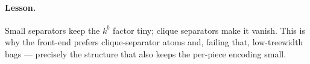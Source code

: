\documentclass[11pt]{article}
\theoremstyle{definition}
\theoremstyle{remark}
\begin{document}
\paragraph{Lesson.} Small separators keep the $k^{b}$ factor tiny; clique
separators make it vanish. This is why the front-end prefers clique-separator atoms
and, failing that, low-treewidth bags --- precisely the structure that also keeps
the per-piece encoding small.



\end{document}
